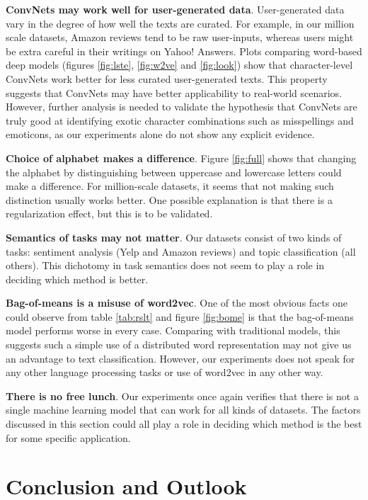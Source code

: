 \documentclass{article} %
\begin{document}
\textbf{ConvNets may work well for user-generated data}. User-generated data vary in the degree of how well the texts are curated. For example, in our million scale datasets, Amazon reviews tend to be raw user-inputs, whereas users might be extra careful in their writings on Yahoo! Answers. Plots comparing word-based deep models (figures \ref{fig:lste}, \ref{fig:w2ve} and \ref{fig:look}) show that character-level ConvNets work better for less curated user-generated texts. This property suggests that ConvNets may have better applicability to real-world scenarios. However, further analysis is needed to validate the hypothesis that ConvNets are truly good at identifying exotic character combinations such as misspellings and emoticons, as our experiments alone do not show any explicit evidence.

\textbf{Choice of alphabet makes a difference}. Figure \ref{fig:full} shows that changing the alphabet by distinguishing between uppercase and lowercase letters could make a difference. For million-scale datasets, it seems that not making such distinction usually works better. One possible explanation is that there is a regularization effect, but this is to be validated.

\textbf{Semantics of tasks may not matter}. Our datasets consist of two kinds of tasks: sentiment analysis (Yelp and Amazon reviews) and topic classification (all others). This dichotomy in task semantics does not seem to play a role in deciding which method is better.

\textbf{Bag-of-means is a misuse of word2vec}\cite{LKW15}. One of the most obvious facts one could observe from table \ref{tab:rslt} and figure \ref{fig:bome} is that the bag-of-means model performs worse in every case. Comparing with traditional models, this suggests such a simple use of a distributed word representation may not give us an advantage to text classification. However, our experiments does not speak for any other language processing tasks or use of word2vec in any other way.

\textbf{There is no free lunch}. Our experiments once again verifies that there is not a single machine learning model that can work for all kinds of datasets. The factors discussed in this section could all play a role in deciding which method is the best for some specific application.

\section{Conclusion and Outlook}
\end{document}
